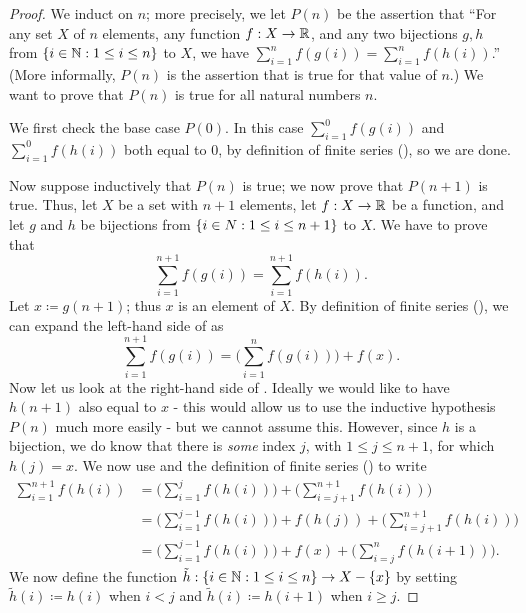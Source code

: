 \begin{proof}
  We induct on \(n\);
  more precisely, we let \(P(n)\) be the assertion that ``For any set \(X\) of \(n\) elements, any function \(f : X \to \mathbb{R}\), and any two bijections \(g, h\) from \(\left\lbrace i \in \mathbb{N} : 1 \leq i \leq n\right\rbrace\) to \(X\), we have \(\sum_{i = 1}^n f(g(i)) = \sum_{i = 1}^n f(h(i))\).''
  (More informally, \(P(n)\) is the assertion that  is true for that value of \(n\).)
  We want to prove that \(P(n)\) is true for all natural numbers \(n\).

  We first check the base case \(P(0)\).
  In this case \(\sum_{i = 1}^0 f(g(i))\) and \(\sum_{i = 1}^0 f(h(i))\) both equal to \(0\), by definition of finite series (), so we are done.

  Now suppose inductively that \(P(n)\) is true;
  we now prove that \(P(n + 1)\) is true.
  Thus, let \(X\) be a set with \(n + 1\) elements, let \(f : X \to \mathbb{R}\) be a function, and let \(g\) and \(h\) be bijections from \(\left\lbrace i \in N : 1 \leq i \leq n + 1\right\rbrace\) to \(X\).
  We have to prove that
  \[
    \sum_{i = 1}^{n + 1} f(g(i)) = \sum_{i = 1}^{n + 1} f(h(i)). \tag{i:7.1}\label{i:eq 7.1}
  \]
  Let \(x \coloneqq g(n + 1)\);
  thus \(x\) is an element of \(X\).
  By definition of finite series (), we can expand the left-hand side of  as
  \[
    \sum_{i = 1}^{n + 1} f(g(i)) = \Bigg(\sum_{i = 1}^n f(g(i))\Bigg) + f(x).
  \]
  Now let us look at the right-hand side of .
  Ideally we would like to have \(h(n + 1)\) also equal to \(x\)
  - this would allow us to use the inductive hypothesis \(P(n)\) much more easily
  - but we cannot assume this.
  However, since \(h\) is a bijection, we do know that there is \emph{some} index \(j\), with \(1 \leq j \leq n + 1\), for which \(h(j) = x\).
  We now use  and the definition of finite series () to write
  \begin{align*}
    \sum_{i = 1}^{n + 1} f(h(i)) & = \Bigg(\sum_{i = 1}^j f(h(i))\Bigg) + \Bigg(\sum_{i = j + 1}^{n + 1} f(h(i))\Bigg)                 \\
                                 & = \Bigg(\sum_{i = 1}^{j - 1} f(h(i))\Bigg) + f(h(j)) + \Bigg(\sum_{i = j + 1}^{n + 1} f(h(i))\Bigg) \\
                                 & = \Bigg(\sum_{i = 1}^{j - 1} f(h(i))\Bigg) + f(x) + \Bigg(\sum_{i = j}^n f(h(i + 1))\Bigg).
  \end{align*}
  We now define the function \(\tilde{h} : \left\lbrace i \in \mathbb{N} : 1 \leq i \leq n\right\rbrace \to X - \left\lbrace x\right\rbrace\) by setting \(\tilde{h}(i) \coloneqq h(i)\) when \(i < j\) and \(\tilde{h}(i) \coloneqq h(i + 1)\) when \(i \geq j\).

\end{proof}
